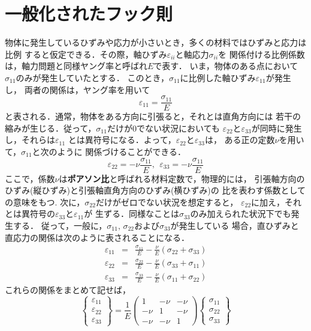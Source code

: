 \documentclass[10pt,a4j]{jarticle}
\begin{document}
\section{一般化されたフック則}
物体に発生しているひずみや応力が小さいとき，多くの材料ではひずみと応力は比例
すると仮定できる．その際，軸ひずみ$\varepsilon_{ii}$と軸応力$\sigma_{ii}$を
関係付ける比例係数は，軸力問題と同様ヤング率と呼ばれ$E$で表す．
いま，物体のある点において$\sigma_{11}$のみが発生していたとする．
このとき，$\sigma_{11}$に比例した軸ひずみ$\varepsilon_{11}$が発生し，
両者の関係は，ヤング率を用いて
\begin{equation}
	\varepsilon_{11}=\frac{\sigma_{11}}{E}
\end{equation}
と表される．通常，物体をある方向に引張ると，それとは直角方向には
若干の縮みが生じる．従って，$\sigma_{11}$だけが0でない状況においても
$\varepsilon_{22}$と$\varepsilon_{33}$が同時に発生し，それらは$\varepsilon_{11}$
とは異符号になる．よって，$\varepsilon_{22}$と$\varepsilon_{33}$は，
ある正の定数$\nu$を用いて，$\sigma_{11}$と次のように
関係づけることができる．
\begin{equation}
	\varepsilon_{22}=-\nu \frac{\sigma_{11}}{E}, \ \
	\varepsilon_{33}=-\nu \frac{\sigma_{11}}{E}
\end{equation}
ここで，係数$\nu$は{\bf ポアソン比}と呼ばれる材料定数で，物理的には，
引張軸方向のひずみ(縦ひずみ)と引張軸直角方向のひずみ(横ひずみ)の
比を表わす係数としての意味をもつ. 次に，$\sigma_{22}$だけがゼロでない状況を想定すると，
$\varepsilon_{22}$に加え，それとは異符号の$\varepsilon_{33}$と$\varepsilon_{11}$が
生ずる．同様なことは$\sigma_{33}$のみ加えられた状況下でも発生する．
従って，一般に，$\sigma_{11},\,\sigma_{22}$および$\sigma_{33}$が発生している
場合，直ひずみと直応力の関係は次のように表されることになる．
\begin{eqnarray}
	\varepsilon_{11} &=& \frac{\sigma_{11}}{E}-\frac{\nu}{E}\left( \sigma_{22}+\sigma_{33} \right) \\
	\varepsilon_{22} &=& \frac{\sigma_{22}}{E}-\frac{\nu}{E}\left( \sigma_{33}+\sigma_{11} \right) \\
	\varepsilon_{33} &=& \frac{\sigma_{33}}{E}-\frac{\nu}{E}\left( \sigma_{11}+\sigma_{22} \right)
	\label{eqn:eii_sjj}
\end{eqnarray}
これらの関係をまとめて記せば，
\begin{equation}
	\left\{ 
	\begin{array}{*{20}{c}}
	\varepsilon _{11}\\
	\varepsilon _{22}\\
	\varepsilon _{33}
	\end{array}
	\right\} 
	= 
	\frac{1}{E}\left( 
	\begin{array}{*{20}{c}}
	1& - \nu & - \nu \\
	 - \nu &1& - \nu \\
	 - \nu & - \nu &1
	\end{array}
	\right)
	\left\{ 
	\begin{array}{*{20}{c}}
	\sigma _{11}\\
	\sigma _{22}\\
	\sigma _{33}
	\end{array} 
	\right\}
	\label{eqn:eii_sjj_mat}
\end{equation}
\end{document}
